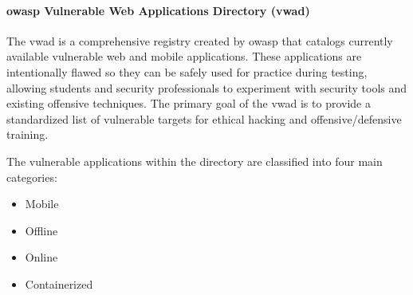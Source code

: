 \paragraph{\gls{owasp} Vulnerable Web Applications Directory (\gls{vwad})}
The \gls{vwad} is a comprehensive registry created by \gls{owasp} that catalogs currently available vulnerable web and mobile applications. These applications are intentionally flawed so they can be safely used for practice during testing, allowing students and security professionals to experiment with security tools and existing offensive techniques. The primary goal of the \gls{vwad} is to provide a standardized list of vulnerable targets for ethical hacking and offensive/defensive training. 

The vulnerable applications within the directory are classified into four main categories:
\begin{itemize}
    \item Mobile
    \item Offline
    \item Online
    \item Containerized
\end{itemize}
